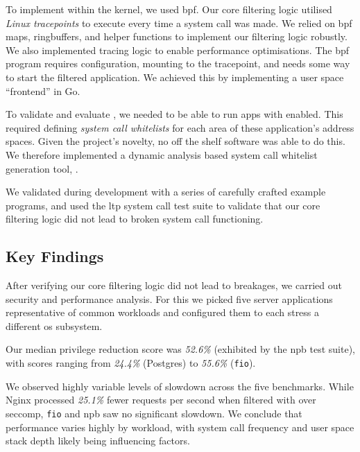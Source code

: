 To implement \af within the kernel, we used \ac{bpf}. Our core filtering logic
utilised \textit{Linux tracepoints} to execute every time a system
call was made. We relied on \ac{bpf} maps, ringbuffers, and helper functions to
implement our filtering logic robustly. We also implemented tracing logic to
enable performance optimisations. The \ac{bpf} program requires configuration,
mounting to the tracepoint, and needs some way to start the filtered
application. We achieved this by implementing a user space ``frontend'' in Go.

To validate and evaluate \af, we needed to be able to run apps with \af enabled.
This required defining \textit{system call whitelists} for each area of these
application's address spaces. Given the project's novelty, no off the shelf
software was able to do this. We therefore implemented a dynamic analysis based
system call whitelist generation tool, \afgen.

We validated \af during development with a series of carefully crafted example
programs, and used the \ac{ltp} system call test suite to validate that our core
filtering logic did not lead to broken system call functioning.  

\subsection{Key Findings}

After verifying our core filtering logic did not lead to breakages, we carried
out security and performance analysis. For this we picked five server 
applications representative of common workloads and configured them to each
stress a different \ac{os} subsystem. 

Our median privilege reduction score was \textit{52.6\%} (exhibited by the
\ac{npb} test suite), with scores ranging from \textit{24.4\%} (Postgres) to
\textit{55.6\%} (\texttt{fio}).

We observed highly variable levels of slowdown across the five benchmarks. While
Nginx processed \textit{25.1\%} fewer requests per second when filtered with \af
over seccomp, \texttt{fio} and \ac{npb} saw no significant slowdown. We conclude
that performance varies highly by workload, with system call frequency and
user space stack depth likely being influencing factors.
